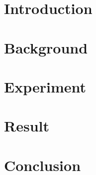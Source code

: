 \documentclass[11pt]{article}
\begin{document}

\section{Introduction}

\section{Background}

\section{Experiment}

\section{Result}

\section{Conclusion}




\end{document}

